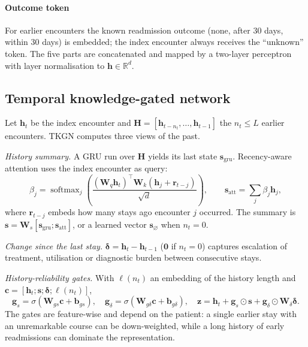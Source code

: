 \documentclass[preprint,12pt,authoryear]{elsarticle}
\newcommand{\R}{\mathbb{R}}
\newcommand{\vect}[1]{\mathbf{#1}}
\begin{document}
\paragraph{Outcome token} For earlier encounters the known readmission
outcome (none, after 30 days, within 30 days) is embedded; the index
encounter always receives the ``unknown'' token. The five parts are
concatenated and mapped by a two-layer perceptron with layer
normalisation to $\vect{h}\in\R^{d}$.

\subsection{Temporal knowledge-gated network}
\label{sec:tkgn}
Let $\vect{h}_t$ be the index encounter and
$\vect{H}=[\vect{h}_{t-n_t},\dots,\vect{h}_{t-1}]$ the $n_t\le L$ earlier
encounters. TKGN computes three views of the past.

\emph{History summary.} A GRU \citep{cho2014gru} run over $\vect{H}$
yields its last state $\vect{s}_{\text{gru}}$. Recency-aware attention uses
the index encounter as query:
\begin{equation}
  \beta_j = \operatorname{softmax}_j\!\left(\frac{(\vect{W}_q\vect{h}_t)^\top
     \vect{W}_k(\vect{h}_j + \vect{r}_{t-j})}{\sqrt{d}}\right),\qquad
  \vect{s}_{\text{att}} = \sum_j \beta_j \vect{h}_j ,
\end{equation}
where $\vect{r}_{t-j}$ embeds how many stays ago encounter $j$ occurred.
The summary is $\vect{s}=\vect{W}_s[\vect{s}_{\text{gru}};\vect{s}_{\text{att}}]$,
or a learned vector $\vect{s}_\varnothing$ when $n_t=0$.

\emph{Change since the last stay.}
$\boldsymbol{\delta} = \vect{h}_t - \vect{h}_{t-1}$ ($\vect{0}$ if $n_t=0$)
captures escalation of treatment, utilisation or diagnostic burden
between consecutive stays.

\emph{History-reliability gates.} With $\boldsymbol{\ell}(n_t)$ an
embedding of the history length and
$\vect{c}=[\vect{h}_t;\vect{s};\boldsymbol{\delta};\boldsymbol{\ell}(n_t)]$,
\begin{equation}
  \vect{g}_s = \sigma(\vect{W}_{gs}\vect{c}+\vect{b}_{gs}),\quad
  \vect{g}_\delta = \sigma(\vect{W}_{g\delta}\vect{c}+\vect{b}_{g\delta}),\quad
  \vect{z} = \vect{h}_t + \vect{g}_s\odot\vect{s}
           + \vect{g}_\delta\odot\vect{W}_\delta\boldsymbol{\delta}.
\end{equation}
The gates are feature-wise and depend on the patient: a single earlier
stay with an unremarkable course can be down-weighted, while a long
history of early readmissions can dominate the representation.
\end{document}
